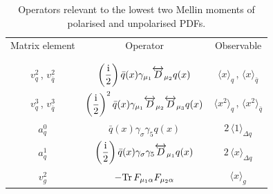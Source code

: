 \begin{table}
\caption{\label{Tab:twist2}
Operators relevant to the lowest two Mellin moments of polarised and unpolarised PDFs.
}
\begin{tabular}{ccc}
Matrix element & Operator & Observable \\ 
\vspace*{-10pt}\\
\hline 
\vspace*{-10pt}\\
$v_q^2$\,, $v_{\bar{q}}^2$  & $\displaystyle \left(\frac{{\rm i}}{2}\right) \bar{q}(x)\gamma_{\mu_1} \overleftrightarrow{D}_{\mu_2} q(x)$ & $\langle x \rangle_q$\,, $\langle x \rangle_{\bar{q}}$   \\
$v_q^3$\,, $v_{\bar{q}}^3$  & $\displaystyle \left(\frac{{\rm i}}{2}\right)^2 \bar{q}(x)\gamma_{\mu_1} \overleftrightarrow{D}_{\mu_2} \overleftrightarrow{D}_{\mu_3} q(x)$ & $\langle x^2 \rangle_q$\,, $\langle x^2 \rangle_{\bar{q}}$ \\
$a_q^0$ & $\displaystyle \bar{q}(x)\gamma_{\sigma} \gamma_5 q(x)$ & $2\, \langle 1 \rangle_{\Delta q}$ \\
$a_q^1$ & $\displaystyle \left(\frac{{\rm i}}{2}\right) \bar{q}(x)\gamma_{\sigma} \gamma_5 \overleftrightarrow{D}_{\mu_1} q(x)$ & $2\, \langle x \rangle_{\Delta q}$ \\
$v_g^2$ & $\displaystyle - {\rm Tr}\, F_{\mu_1\alpha}F_{\mu_2\alpha}$ & $\langle x \rangle_g$ \\
\end{tabular}
\end{table}

